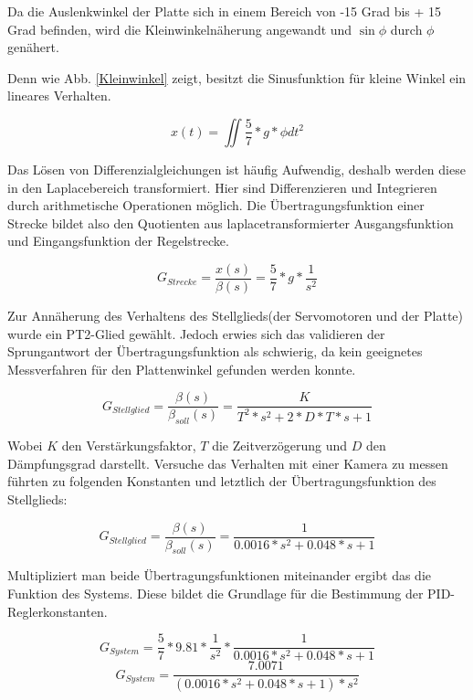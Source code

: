 \documentclass[12pt,a4paper,bibliography=totoc,listof=totoc]{scrartcl}
\begin{document}
Da die Auslenkwinkel der Platte sich in einem Bereich von -15 Grad bis + 15 Grad befinden, wird die Kleinwinkelnäherung angewandt und \(\sin\phi\) durch \(\phi\) genähert.

Denn wie Abb. \ref{Kleinwinkel} zeigt, besitzt die Sinusfunktion für kleine Winkel ein lineares Verhalten.

\begin{equation} 
x(t) =  \iint\dfrac{5}{7}*g* \phi dt^2
\end{equation} 

Das Lösen von Differenzialgleichungen ist häufig Aufwendig, deshalb werden diese in den Laplacebereich transformiert. Hier sind Differenzieren und Integrieren durch arithmetische Operationen möglich. Die Übertragungsfunktion einer Strecke bildet also den Quotienten aus laplacetransformierter Ausgangsfunktion und Eingangsfunktion der Regelstrecke.

\begin{equation} 
G_{Strecke} =  \dfrac{x(s)}{\beta(s)} = \dfrac{5}{7} * g * \dfrac{1}{s^2}
\end{equation}

Zur Annäherung des Verhaltens des Stellglieds(der Servomotoren und der Platte) wurde ein PT2-Glied gewählt. Jedoch erwies sich das validieren der Sprungantwort der Übertragungsfunktion als schwierig, da kein geeignetes Messverfahren für den Plattenwinkel gefunden werden konnte.

\begin{equation} 
G_{Stellglied} =  \dfrac{\beta(s)}{\beta_{soll}(s)} = 
\dfrac{K}{T^2*s^2+2*D*T*s+1}
\end{equation}

Wobei \(K\) den Verstärkungsfaktor, \(T\) die Zeitverzögerung und \(D\) den Dämpfungsgrad darstellt. Versuche das Verhalten mit einer Kamera zu messen führten zu folgenden Konstanten und letztlich der Übertragungsfunktion des Stellglieds:

\begin{equation} 
G_{Stellglied} =  \dfrac{\beta(s)}{\beta_{soll}(s)} = 
\dfrac{1}{0.0016*s^2+0.048*s+1}
\end{equation}

Multipliziert man beide Übertragungsfunktionen miteinander ergibt das die Funktion des Systems. Diese bildet die Grundlage für die Bestimmung der PID-Reglerkonstanten. 

\begin{equation} 
G_{System} = \dfrac{5}{7} * 9.81 * \dfrac{1}{s^2} * \dfrac{1}{0.0016*s^2+0.048*s+1}
\end{equation}
\begin{equation} 
G_{System} = \dfrac{7.0071}{{(0.0016*s^2+0.048*s+1)*s^2}}
\end{equation}
\end{document}
